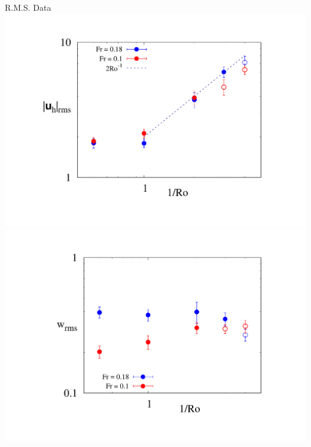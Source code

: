 \documentclass[aspecttatio=169]{beamer}
\begin{document}
\begin{frame}{R.M.S. Data}
        \centering
        \includegraphics[width=1\textwidth]{images/urms_plot.pdf}
    \emp
        \centering
        \includegraphics[width=.96\textwidth]{images/wrms_plot.pdf}
    \emp
    
\end{frame}
\end{document}
